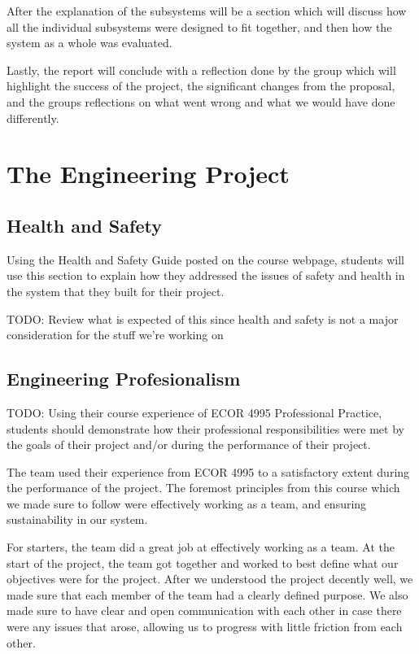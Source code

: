 \documentclass[titlepage]{article}
\begin{document}
After the explanation of the subsystems will be a section which will discuss how all the individual subsystems were designed to fit together, and then how the system as a whole was evaluated.

Lastly, the report will conclude with a reflection done by the group which will highlight the success of the project, the significant changes from the proposal, and the groups reflections on what went wrong and what we would have done differently.

\section{The Engineering Project}

\subsection{Health and Safety}
Using the Health and Safety Guide posted on the course webpage, students will use this section to explain how they addressed the issues of safety and health in the system that they built for their project.

TODO: Review what is expected of this since health and safety is not a major consideration for the stuff we're working on

\subsection{Engineering Profesionalism}
TODO: Using their course experience of ECOR 4995 Professional Practice, students should demonstrate how their professional responsibilities were met by the goals of their project and/or during the performance of their project.

The team used their experience from ECOR 4995 to a satisfactory extent during the performance of the project. The foremost principles from this course which we made sure to follow were effectively working as a team, and ensuring sustainability in our system.

For starters, the team did a great job at effectively working as a team. At the start of the project, the team got together and worked to best define what our objectives were for the project. After we understood the project decently well, we made sure that each member of the team had a clearly defined purpose. We also made sure to have clear and open communication with each other in case there were any issues that arose, allowing us to progress with little friction from each other.
\end{document}
